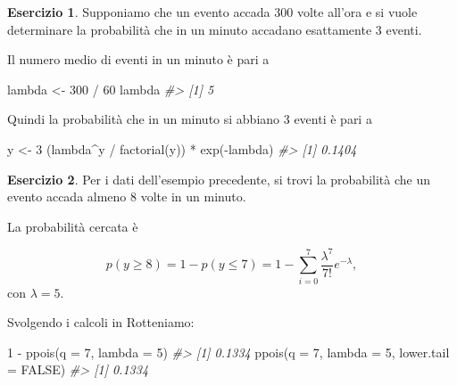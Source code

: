 \documentclass[
  11pt,
]{krantz}
\makeatletter
\newenvironment{Shaded}{\begin{snugshade}}{\end{snugshade}}
\newcommand{\AttributeTok}[1]{\textcolor[rgb]{0.61,0.61,0.61}{#1}}
\newcommand{\CommentTok}[1]{\textcolor[rgb]{0.37,0.37,0.37}{\textit{#1}}}
\newcommand{\ConstantTok}[1]{\textcolor[rgb]{0,0,0}{#1}}
\newcommand{\DecValTok}[1]{\textcolor[rgb]{0.06,0.06,0.06}{#1}}
\newcommand{\FunctionTok}[1]{\textcolor[rgb]{0,0,0}{#1}}
\newcommand{\NormalTok}[1]{#1}
\newcommand{\OtherTok}[1]{\textcolor[rgb]{0.37,0.37,0.37}{#1}}
\newcommand{\SpecialCharTok}[1]{\textcolor[rgb]{0,0,0}{#1}}
\newenvironment{kframe}{%
\medskip{}
\setlength{\fboxsep}{.8em}
 \def\at@end@of@kframe{}%
 \ifinner\ifhmode%
  \def\at@end@of@kframe{\end{minipage}}%
  \begin{minipage}{\columnwidth}%
 \fi\fi%
 \def\FrameCommand##1{\hskip\@totalleftmargin \hskip-\fboxsep
 \colorbox{shadecolor}{##1}\hskip-\fboxsep
     \hskip-\linewidth \hskip-\@totalleftmargin \hskip\columnwidth}%
 \MakeFramed {\advance\hsize-\width
   \@totalleftmargin\z@ \linewidth\hsize
   \@setminipage}}%
 {\par\unskip\endMakeFramed%
 \at@end@of@kframe}
\renewenvironment{Shaded}{\begin{kframe}}{\end{kframe}}
\newcommand{\R}{\textsf{R}} %
\theoremstyle{definition}
\theoremstyle{definition}
\theoremstyle{definition}
\newtheorem{exercise}{Esercizio}[chapter]
\theoremstyle{definition}
\theoremstyle{remark}
\makeatother
\begin{document}
\begin{exercise}

Supponiamo che un evento accada 300 volte all'ora e si vuole determinare la probabilità che in un minuto accadano esattamente 3 eventi.

Il numero medio di eventi in un minuto è pari a

\begin{Shaded}
\begin{Highlighting}[]
\NormalTok{lambda }\OtherTok{\textless{}{-}} \DecValTok{300} \SpecialCharTok{/} \DecValTok{60}
\NormalTok{lambda}
\CommentTok{\#\textgreater{} [1] 5}
\end{Highlighting}
\end{Shaded}

\noindent Quindi la probabilità che in un minuto si abbiano 3 eventi è pari a

\begin{Shaded}
\begin{Highlighting}[]
\NormalTok{y }\OtherTok{\textless{}{-}} \DecValTok{3}
\NormalTok{(lambda}\SpecialCharTok{\^{}}\NormalTok{y }\SpecialCharTok{/} \FunctionTok{factorial}\NormalTok{(y)) }\SpecialCharTok{*} \FunctionTok{exp}\NormalTok{(}\SpecialCharTok{{-}}\NormalTok{lambda)}
\CommentTok{\#\textgreater{} [1] 0.1404}
\end{Highlighting}
\end{Shaded}

\end{exercise}

\begin{exercise}

Per i dati dell'esempio precedente, si trovi la probabilità che un evento accada almeno 8 volte in un minuto.

La probabilità cercata è

\[
p(y \geq 8) = 1 - p (y \leq 7) = 1- \sum_{i = 0}^7 \frac{\lambda^7}{7!}e^{-\lambda},
\] \noindent con \(\lambda = 5\).

Svolgendo i calcoli in \R otteniamo:

\begin{Shaded}
\begin{Highlighting}[]
\DecValTok{1} \SpecialCharTok{{-}} \FunctionTok{ppois}\NormalTok{(}\AttributeTok{q =} \DecValTok{7}\NormalTok{, }\AttributeTok{lambda =} \DecValTok{5}\NormalTok{)}
\CommentTok{\#\textgreater{} [1] 0.1334}
\FunctionTok{ppois}\NormalTok{(}\AttributeTok{q =} \DecValTok{7}\NormalTok{, }\AttributeTok{lambda =} \DecValTok{5}\NormalTok{, }\AttributeTok{lower.tail =} \ConstantTok{FALSE}\NormalTok{)}
\CommentTok{\#\textgreater{} [1] 0.1334}
\end{Highlighting}
\end{Shaded}

\end{exercise}
\end{document}
